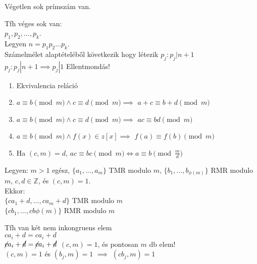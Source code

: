\documentclass{beamer}
\begin{document}
\begin{frame}

\begin{tcolorbox}[title={Tétel: Eukleidész tétele}]
Végetlen sok prímszám van.
\end{tcolorbox}

\begin{tcolorbox}[title={Bizonyítás (Indirekt)}]
Tfh véges sok van:\\
$p_1, p_2, ... ,p_k$.\\
Legyen $n = p_1p_2...p_k$.\\
Számelmélet alaptételéből következik hogy létezik $p_j : p_j | n + 1$\\
$p_j : p_j | n + 1 \implies p_j | 1$ Ellentmondás!
\end{tcolorbox}

\end{frame}

\begin{frame}

\begin{tcolorbox}[title={Tétel: Kongruencia tulajdonságai}]
\begin{enumerate}
\item Ekvivalencia reláció
\item $a \equiv b \pmod{m} \land c \equiv d \pmod{m} \implies$ \textbf{$a + c \equiv b + d \pmod{m}$}
\item $a \equiv b \pmod{m} \land c \equiv d \pmod{m} \implies$ \textbf{$ac \equiv bd \pmod{m}$}
\item $a \equiv b \pmod{m} \land f(x) \in z[x] \implies$ \textbf{$f(a) \equiv f(b) \pmod{m}$}
\item Ha $(c, m) = d$, $ac \equiv bc \pmod{m} \iff a \equiv b \pmod{\frac{m}{d}}$
\end{enumerate}
\end{tcolorbox}

\end{frame}

\begin{frame}

\begin{tcolorbox}[title={Tétel: Omnibusz tétel}]
Legyen: $m > 1$ egész, $\{a_1, ..., a_m\}$ TMR modulo $m$, $\{b_1, ..., b_{{\phi}(m)}\}$ RMR modulo $m$, $c, d \in \mathbb{Z}$, és $(c,m) = 1$.\\
\smallskip
Ekkor:\\
\smallskip
$\{ ca_1 + d, ..., ca_m + d \}$ TMR modulo $m$\\
$\{ cb_1, ..., cb{{\phi}(m)}\}$ RMR modulo $m$
\end{tcolorbox}

\begin{tcolorbox}[title={Bizonyítás (Indirekt)}]
Tfh van két nem inkongruens elem\\
$ca_i + d = ca_i + d$\\
${\cancel{c}}a_i + {\cancel{d}} = {\cancel{c}}a_i + {\cancel{d}}$ $(c, m) = 1$, és pontosan $m$ db elem!\\
$(c, m) = 1$ és $(b_j,m) = 1$ $\implies$ $(cb_j, m) = 1$

\end{tcolorbox}

\end{frame}
\end{document}
